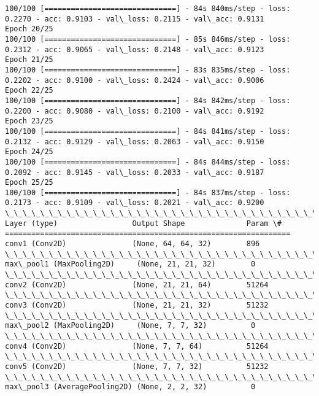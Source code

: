 \documentclass[11pt]{article}
\begin{document}
\begin{Verbatim}[commandchars=\\\{\}]
100/100 [==============================] - 84s 840ms/step - loss: 0.2270 - acc: 0.9103 - val\_loss: 0.2115 - val\_acc: 0.9131
Epoch 20/25
100/100 [==============================] - 85s 846ms/step - loss: 0.2312 - acc: 0.9065 - val\_loss: 0.2148 - val\_acc: 0.9123
Epoch 21/25
100/100 [==============================] - 83s 835ms/step - loss: 0.2202 - acc: 0.9100 - val\_loss: 0.2424 - val\_acc: 0.9006
Epoch 22/25
100/100 [==============================] - 84s 842ms/step - loss: 0.2200 - acc: 0.9080 - val\_loss: 0.2100 - val\_acc: 0.9192
Epoch 23/25
100/100 [==============================] - 84s 841ms/step - loss: 0.2132 - acc: 0.9129 - val\_loss: 0.2063 - val\_acc: 0.9150
Epoch 24/25
100/100 [==============================] - 84s 844ms/step - loss: 0.2092 - acc: 0.9145 - val\_loss: 0.2033 - val\_acc: 0.9187
Epoch 25/25
100/100 [==============================] - 84s 837ms/step - loss: 0.2173 - acc: 0.9109 - val\_loss: 0.2021 - val\_acc: 0.9200
\_\_\_\_\_\_\_\_\_\_\_\_\_\_\_\_\_\_\_\_\_\_\_\_\_\_\_\_\_\_\_\_\_\_\_\_\_\_\_\_\_\_\_\_\_\_\_\_\_\_\_\_\_\_\_\_\_\_\_\_\_\_\_\_\_
Layer (type)                 Output Shape              Param \#   
=================================================================
conv1 (Conv2D)               (None, 64, 64, 32)        896       
\_\_\_\_\_\_\_\_\_\_\_\_\_\_\_\_\_\_\_\_\_\_\_\_\_\_\_\_\_\_\_\_\_\_\_\_\_\_\_\_\_\_\_\_\_\_\_\_\_\_\_\_\_\_\_\_\_\_\_\_\_\_\_\_\_
max\_pool1 (MaxPooling2D)     (None, 21, 21, 32)        0         
\_\_\_\_\_\_\_\_\_\_\_\_\_\_\_\_\_\_\_\_\_\_\_\_\_\_\_\_\_\_\_\_\_\_\_\_\_\_\_\_\_\_\_\_\_\_\_\_\_\_\_\_\_\_\_\_\_\_\_\_\_\_\_\_\_
conv2 (Conv2D)               (None, 21, 21, 64)        51264     
\_\_\_\_\_\_\_\_\_\_\_\_\_\_\_\_\_\_\_\_\_\_\_\_\_\_\_\_\_\_\_\_\_\_\_\_\_\_\_\_\_\_\_\_\_\_\_\_\_\_\_\_\_\_\_\_\_\_\_\_\_\_\_\_\_
conv3 (Conv2D)               (None, 21, 21, 32)        51232     
\_\_\_\_\_\_\_\_\_\_\_\_\_\_\_\_\_\_\_\_\_\_\_\_\_\_\_\_\_\_\_\_\_\_\_\_\_\_\_\_\_\_\_\_\_\_\_\_\_\_\_\_\_\_\_\_\_\_\_\_\_\_\_\_\_
max\_pool2 (MaxPooling2D)     (None, 7, 7, 32)          0         
\_\_\_\_\_\_\_\_\_\_\_\_\_\_\_\_\_\_\_\_\_\_\_\_\_\_\_\_\_\_\_\_\_\_\_\_\_\_\_\_\_\_\_\_\_\_\_\_\_\_\_\_\_\_\_\_\_\_\_\_\_\_\_\_\_
conv4 (Conv2D)               (None, 7, 7, 64)          51264     
\_\_\_\_\_\_\_\_\_\_\_\_\_\_\_\_\_\_\_\_\_\_\_\_\_\_\_\_\_\_\_\_\_\_\_\_\_\_\_\_\_\_\_\_\_\_\_\_\_\_\_\_\_\_\_\_\_\_\_\_\_\_\_\_\_
conv5 (Conv2D)               (None, 7, 7, 32)          51232     
\_\_\_\_\_\_\_\_\_\_\_\_\_\_\_\_\_\_\_\_\_\_\_\_\_\_\_\_\_\_\_\_\_\_\_\_\_\_\_\_\_\_\_\_\_\_\_\_\_\_\_\_\_\_\_\_\_\_\_\_\_\_\_\_\_
max\_pool3 (AveragePooling2D) (None, 2, 2, 32)          0         

\end{Verbatim}
\end{document}
